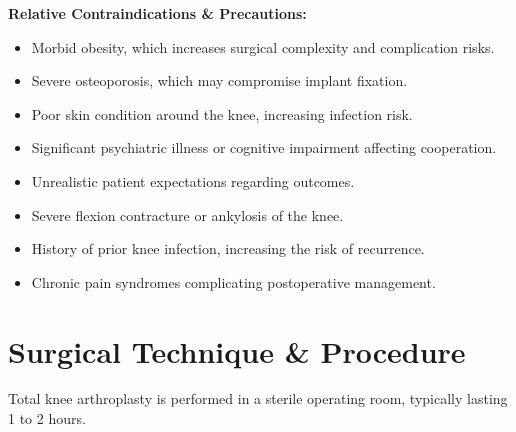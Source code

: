 \textbf{Relative Contraindications \& Precautions:}
\begin{itemize}
  \item Morbid obesity, which increases surgical complexity and complication risks.
  \item Severe osteoporosis, which may compromise implant fixation.
  \item Poor skin condition around the knee, increasing infection risk.
  \item Significant psychiatric illness or cognitive impairment affecting cooperation.
  \item Unrealistic patient expectations regarding outcomes.
  \item Severe flexion contracture or ankylosis of the knee.
  \item History of prior knee infection, increasing the risk of recurrence.
  \item Chronic pain syndromes complicating postoperative management.
\end{itemize}

\section*{Surgical Technique \& Procedure}
Total knee arthroplasty is performed in a sterile operating room, typically lasting 1 to 2 hours.

